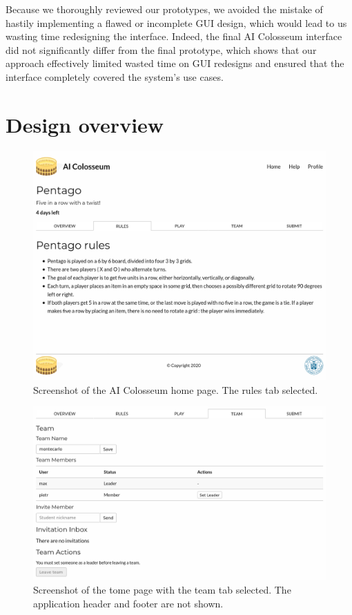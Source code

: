 Because we thoroughly reviewed our prototypes, we avoided the mistake of hastily implementing a flawed or incomplete GUI design, which would lead to us wasting time redesigning the interface. Indeed, the final AI Colosseum interface did not significantly differ from the final prototype, which shows that our approach effectively limited wasted time on GUI redesigns and ensured that the interface completely covered the system's use cases.

\section{Design overview}

\begin{figure}[t]
    \centering\includegraphics[width=\textwidth]{figures/www_rules.png}
	\caption{Screenshot of the AI Colosseum home page. The rules tab selected.}\label{fig:gui_home}
\end{figure}

\begin{figure}[t]
    \centering\includegraphics[width=\textwidth]{figures/www_team.png}
	\caption{Screenshot of the tome page with the team tab selected. The application header and footer are not shown.}\label{fig:gui_team}
\end{figure}

